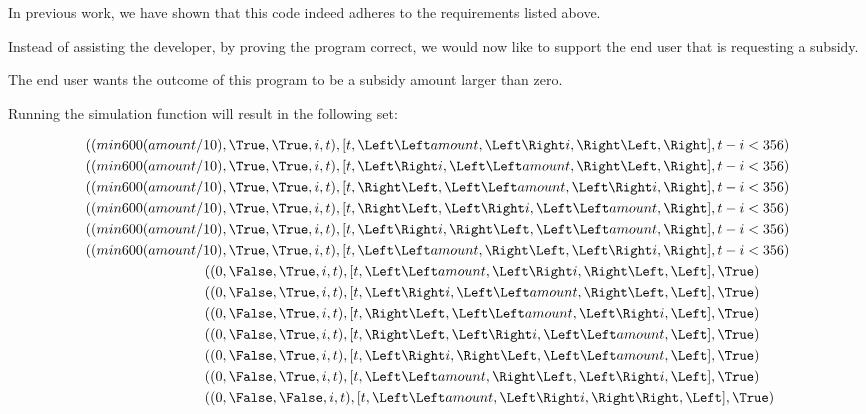 In previous work, we have shown that this code indeed adheres to the requirements listed above.

Instead of assisting the developer, by proving the program correct, we would now like to support the end user that is requesting a subsidy.

The end user wants the outcome of this program to be a subsidy amount larger than zero.

Running the simulation function will result in the following set:

\begin{align*}
  ((min 600 (amount/10)&,  \True, \True, i, t),[t,\Left \Left amount,     \Left \Right i, \Right \Left, \Right],t-i<356)\\
  ((min 600 (amount/10)&,  \True, \True, i, t),[t,    \Left \Right i, \Left \Left amount, \Right \Left, \Right],t-i<356)\\
  ((min 600 (amount/10)&,  \True, \True, i, t),[t,      \Right \Left, \Left \Left amount, \Left \Right i, \Right],t-i<356)\\
  ((min 600 (amount/10)&,  \True, \True, i, t),[t,      \Right \Left, \Left \Right i, \Left \Left amount, \Right],t-i<356)\\
  ((min 600 (amount/10)&,  \True, \True, i, t),[t,    \Left \Right i, \Right \Left, \Left \Left amount, \Right],t-i<356)\\
  ((min 600 (amount/10)&,  \True, \True, i, t),[t,\Left \Left amount, \Right \Left, \Left \Right i, \Right],t-i<356)\\
  ((                  0&, \False, \True, i, t),[t,\Left \Left amount, \Left \Right i, \Right \Left, \Left],\True)\\
  ((                  0&, \False, \True, i, t),[t,    \Left \Right i, \Left \Left amount, \Right \Left, \Left],\True)\\
  ((                  0&, \False, \True, i, t),[t,      \Right \Left, \Left \Left amount, \Left \Right i, \Left],\True)\\
  ((                  0&, \False, \True, i, t),[t,      \Right \Left, \Left \Right i, \Left \Left amount, \Left],\True)\\
  ((                  0&, \False, \True, i, t),[t,    \Left \Right i, \Right \Left, \Left \Left amount, \Left],\True)\\
  ((                  0&, \False, \True, i, t),[t,\Left \Left amount, \Right \Left, \Left \Right i, \Left],\True)\\
  ((                  0&, \False,\False, i, t),[t,\Left \Left amount, \Left \Right i, \Right \Right, \Left],\True)\\

\end{align*}
